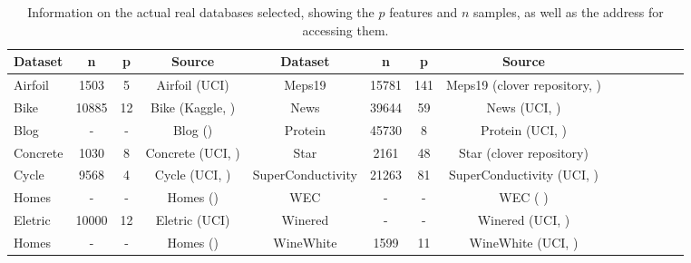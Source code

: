 \begin{table*}[ht]
\caption{Information on the actual real databases selected, showing the $p$ features and $n$ samples, as well as the address for accessing them.}
\label{tab:realdata}
\begin{adjustbox}{width=0.9\textwidth,center}
\begin{tabular}{lccccccccccccp{15mm}}
\hline
\textbf{Dataset} & n & p & Source& \textbf{Dataset} & n & p &Source  \\
\hline
Airfoil & 1503  & 5  & Airfoil (UCI) & Meps19& 15781  & 141 & Meps19 (clover repository, \cite{github_clover_meps}) \\
Bike & 10885 & 12 & Bike (Kaggle, \cite{kaggle_bike_sharing_demand}) & News  & 39644  & 59 & News (UCI, \cite{online_news_popularity_332}) \\
Blog & - & -  & Blog ()  & Protein  & 45730 & 8 & Protein (UCI, \cite{physicochemical_properties_of_protein_tertiary_structure_265}) \\
Concrete & 1030  & 8 & Concrete (UCI, \cite{concrete_compressive_strength_165}) & Star & 2161  & 48 & Star (clover repository) \\
Cycle & 9568 & 4 & Cycle (UCI, \cite{combined_cycle_power_plant_294}) & SuperConductivity & 21263 & 81 & SuperConductivity (UCI, \cite{superconductivty_data_464}) \\
Homes & - & -  & Homes () & WEC& -  & - & WEC ( ) \\
Eletric & 10000 & 12  & Eletric (UCI) & Winered & -  & - & Winered (UCI, \cite{wine_quality_186})\\
Homes & - & -  & Homes () & WineWhite& 1599  & 11 & WineWhite (UCI, \cite{wine_quality_186}) \\
\hline
\end{tabular}
\end{adjustbox}
\end{table*}